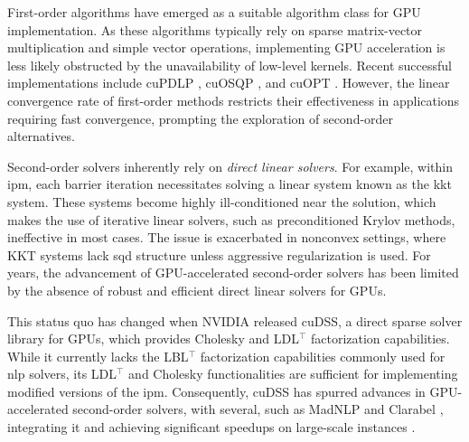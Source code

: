 \documentclass{article}
\begin{document}
First-order algorithms have emerged as a suitable algorithm class for GPU implementation. As these algorithms typically rely on sparse matrix-vector multiplication and simple vector operations, implementing GPU acceleration is less likely obstructed by the unavailability of low-level kernels. Recent successful implementations include cuPDLP \cite{luCuPDLPCStrengthenedImplementation2024,luCuPDLPFurtherEnhanced2025}, cuOSQP \cite{schubigerGPUAccelerationADMM2020}, and cuOPT \cite{NVIDIACuopt2025}. However, the linear convergence rate of first-order methods restricts their effectiveness in applications requiring fast convergence, prompting the exploration of second-order alternatives.

Second-order solvers inherently rely on \emph{direct linear solvers}. For example, within \gls*{ipm}, each barrier iteration necessitates solving a linear system known as the \gls*{kkt} system. These systems become highly ill-conditioned near the solution, which makes the use of iterative linear solvers, such as preconditioned Krylov methods, ineffective in most cases. The issue is exacerbated in nonconvex settings, where KKT systems lack \gls*{sqd} structure unless aggressive regularization is used. For years, the advancement of GPU-accelerated second-order solvers has been limited by the absence of robust and efficient direct linear solvers for GPUs.

This status quo has changed when NVIDIA released cuDSS, a direct sparse solver library for GPUs, which provides Cholesky and LDL$^\top$ factorization capabilities. While it currently lacks the LBL$^\top$ factorization capabilities commonly used for \gls*{nlp} solvers, its LDL$^\top$ and Cholesky functionalities are sufficient for implementing modified versions of the \gls*{ipm}. Consequently, cuDSS has spurred advances in GPU-accelerated second-order solvers, with several, such as MadNLP \cite{shinAcceleratingOptimalPower2024} and Clarabel \cite{goulartClarabelInteriorpointSolver2024}, integrating it and achieving significant speedups on large-scale instances \cite{shinNVIDIACuDSSLibrary2024,shinAcceleratingOptimalPower2024,pacaudCondensedspaceMethodsNonlinear2024,shinScalableMultiPeriodAC2024,pacaudGPUacceleratedDynamicNonlinear2024}.
\end{document}
